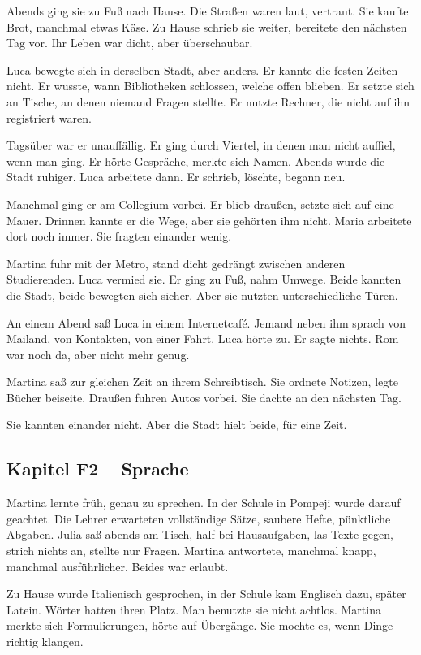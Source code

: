 \documentclass[
]{article}
\begin{document}
Abends ging sie zu Fuß nach Hause. Die Straßen waren laut, vertraut. Sie kaufte Brot, manchmal etwas Käse. Zu Hause schrieb sie weiter, bereitete den nächsten Tag vor. Ihr Leben war dicht, aber überschaubar.

Luca bewegte sich in derselben Stadt, aber anders. Er kannte die festen Zeiten nicht. Er wusste, wann Bibliotheken schlossen, welche offen blieben. Er setzte sich an Tische, an denen niemand Fragen stellte. Er nutzte Rechner, die nicht auf ihn registriert waren.

Tagsüber war er unauffällig. Er ging durch Viertel, in denen man nicht auffiel, wenn man ging. Er hörte Gespräche, merkte sich Namen. Abends wurde die Stadt ruhiger. Luca arbeitete dann. Er schrieb, löschte, begann neu.

Manchmal ging er am Collegium vorbei. Er blieb draußen, setzte sich auf eine Mauer. Drinnen kannte er die Wege, aber sie gehörten ihm nicht. Maria arbeitete dort noch immer. Sie fragten einander wenig.

Martina fuhr mit der Metro, stand dicht gedrängt zwischen anderen Studierenden. Luca vermied sie. Er ging zu Fuß, nahm Umwege. Beide kannten die Stadt, beide bewegten sich sicher. Aber sie nutzten unterschiedliche Türen.

An einem Abend saß Luca in einem Internetcafé. Jemand neben ihm sprach von Mailand, von Kontakten, von einer Fahrt. Luca hörte zu. Er sagte nichts. Rom war noch da, aber nicht mehr genug.

Martina saß zur gleichen Zeit an ihrem Schreibtisch. Sie ordnete Notizen, legte Bücher beiseite. Draußen fuhren Autos vorbei. Sie dachte an den nächsten Tag.

Sie kannten einander nicht. Aber die Stadt hielt beide, für eine Zeit.

\subsection{Kapitel F2 -- Sprache}\label{kapitel-f2-sprache}

Martina lernte früh, genau zu sprechen. In der Schule in Pompeji wurde darauf geachtet. Die Lehrer erwarteten vollständige Sätze, saubere Hefte, pünktliche Abgaben. Julia saß abends am Tisch, half bei Hausaufgaben, las Texte gegen, strich nichts an, stellte nur Fragen. Martina antwortete, manchmal knapp, manchmal ausführlicher. Beides war erlaubt.

Zu Hause wurde Italienisch gesprochen, in der Schule kam Englisch dazu, später Latein. Wörter hatten ihren Platz. Man benutzte sie nicht achtlos. Martina merkte sich Formulierungen, hörte auf Übergänge. Sie mochte es, wenn Dinge richtig klangen.
\end{document}
